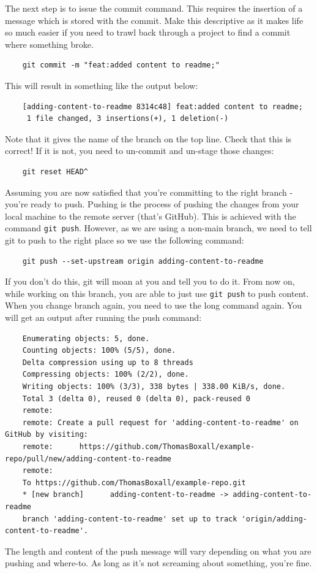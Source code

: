 \documentclass[a4paper, 11pt]{article}
\begin{document}
The next step is to issue the commit command. This requires the insertion of a message which is stored with the commit. Make this descriptive as it makes life so much easier if you need to trawl back through a project to find a commit where something broke.
\begin{verbatim}
    git commit -m "feat:added content to readme;"
\end{verbatim}
This will result in something like the output below:
\begin{verbatim}
    [adding-content-to-readme 8314c48] feat:added content to readme;
     1 file changed, 3 insertions(+), 1 deletion(-)
\end{verbatim}
Note that it gives the name of the branch on the top line. Check that this is correct! If it is not, you need to un-commit and un-stage those changes:
\begin{verbatim}
    git reset HEAD^
\end{verbatim}

Assuming you are now satisfied that you're committing to the right branch - you're ready to push. Pushing is the process of pushing the changes from your local machine to the remote server (that's GitHub). This is achieved with the command \verb|git push|. However, as we are using a non-main branch, we need to tell git to push to the right place so we use the following command:
\begin{verbatim}
    git push --set-upstream origin adding-content-to-readme
\end{verbatim}
If you don't do this, git will moan at you and tell you to do it. From now on, while working on this branch, you are able to just use \verb|git push| to push content. When you change branch again, you need to use the long command again. You will get an output after running the push command:
\begin{verbatim}
    Enumerating objects: 5, done.
    Counting objects: 100% (5/5), done.
    Delta compression using up to 8 threads
    Compressing objects: 100% (2/2), done.
    Writing objects: 100% (3/3), 338 bytes | 338.00 KiB/s, done.
    Total 3 (delta 0), reused 0 (delta 0), pack-reused 0
    remote:
    remote: Create a pull request for 'adding-content-to-readme' on GitHub by visiting:
    remote:      https://github.com/ThomasBoxall/example-repo/pull/new/adding-content-to-readme
    remote:
    To https://github.com/ThomasBoxall/example-repo.git
    * [new branch]      adding-content-to-readme -> adding-content-to-readme
    branch 'adding-content-to-readme' set up to track 'origin/adding-content-to-readme'.
\end{verbatim}
The length and content of the push message will vary depending on what you are pushing and where-to. As long as it's not screaming about something, you're fine.
\end{document}

